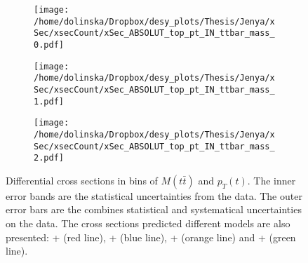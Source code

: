 \begin{figure}[p]
\centering
\begin{subfigure}
  \centering
  \texttt{[image: /home/dolinska/Dropbox/desy\_plots/Thesis/Jenya/xSec/xsecCount/xSec\_ABSOLUT\_top\_pt\_IN\_ttbar\_mass\_0.pdf]}
\end{subfigure}
\begin{subfigure}
  \centering
  \texttt{[image: /home/dolinska/Dropbox/desy\_plots/Thesis/Jenya/xSec/xsecCount/xSec\_ABSOLUT\_top\_pt\_IN\_ttbar\_mass\_1.pdf]}
\end{subfigure}
\begin{subfigure}
  \centering
  \texttt{[image: /home/dolinska/Dropbox/desy\_plots/Thesis/Jenya/xSec/xsecCount/xSec\_ABSOLUT\_top\_pt\_IN\_ttbar\_mass\_2.pdf]}
\end{subfigure}
\caption{Differential cross sections in bins of $M(t\bar{t})$ and $p_{T}(t)$. The inner error bands are the statistical uncertainties from the data.
         The outer error bars are the combines statistical and systematical uncertainties on the data. The cross sections predicted different models are also presented:
         \MG + \PYTHIA (red line), \Powheg + \PYTHIA (blue line), \Powheg + \HERWIG (orange line) and \MCNLO + \HERWIG (green line).}
\label{fig:XSU_2D_Mtt_pt}
\end{figure}

